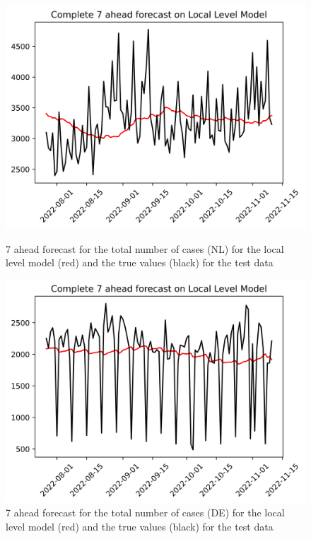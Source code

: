 
\begin{figure}

\begin{minipage}{.45\textwidth}
  \centering
  \includegraphics[width=\linewidth]{pics/7_ah/Complete_7_ahead_Local Level Model.png}
  \caption{7 ahead forecast for the total number of cases (NL) for the local level model (red) and the true values (black) for the test data}
  \label{fig:tot_cases_fc_7_LLM}
\end{minipage}
\begin{minipage}{.45\textwidth}
  \centering
  \includegraphics[width=\linewidth]{pics/7_ah/DE_Complete_7_ahead_Local Level Model.png}
  \caption{7 ahead forecast for the total number of cases (DE) for the local level model (red) and the true values (black) for the test data}
  \label{fig:tot_cases_fc_7_LLM_DE}
\end{minipage}

\end{figure}
